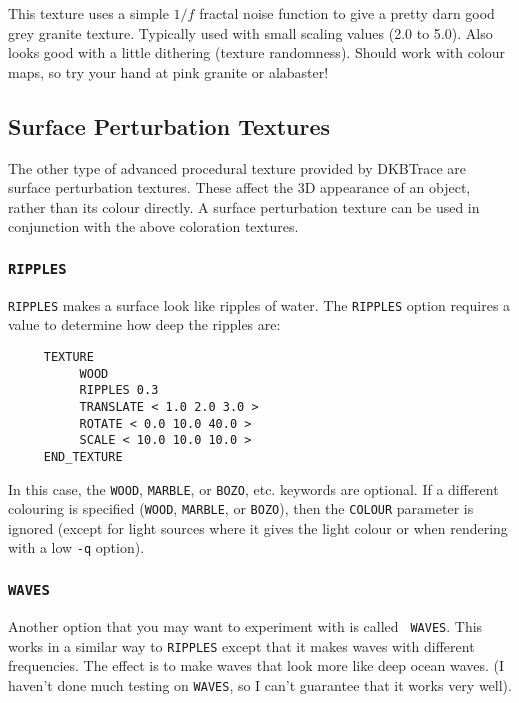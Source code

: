 This texture uses a simple $1/f$ fractal noise function to give a pretty darn
good grey granite texture.  Typically used with small scaling values (2.0 to
5.0).  Also looks good with a little dithering (texture randomness).  Should
work with colour maps, so try your hand at pink granite or alabaster! 

\subsection{Surface Perturbation Textures}

The other type of advanced procedural texture provided by DKBTrace are
surface perturbation textures. These affect the 3D appearance of an
object, rather than its colour directly. A surface perturbation
texture can be used in conjunction with the above coloration textures.

\subsubsection{{\tt RIPPLES}}

{\tt RIPPLES} makes a surface look like ripples of water.  The
{\tt RIPPLES} option requires a value to determine how deep the ripples
are:
\begin{verbatim}
     TEXTURE
          WOOD
          RIPPLES 0.3
          TRANSLATE < 1.0 2.0 3.0 >
          ROTATE < 0.0 10.0 40.0 >
          SCALE < 10.0 10.0 10.0 >
     END_TEXTURE
\end{verbatim}
In this case, the {\tt WOOD}, {\tt MARBLE}, or {\tt BOZO}, etc.
keywords are optional.  If a different colouring is specified
({\tt WOOD}, {\tt MARBLE}, or {\tt BOZO}), then the
{\tt COLOUR}%
parameter is ignored (except for light sources where it gives the
light colour or when rendering with a low {\tt -q} option).

\subsubsection{{\tt WAVES}}

Another option that you may want to experiment with is called {\tt
WAVES}.  This works in a similar way to {\tt RIPPLES} except that it
makes waves with different frequencies.  The effect is to make waves
that look more like deep ocean waves. (I haven't done much testing on
{\tt WAVES}, so I can't guarantee that it works very well).

